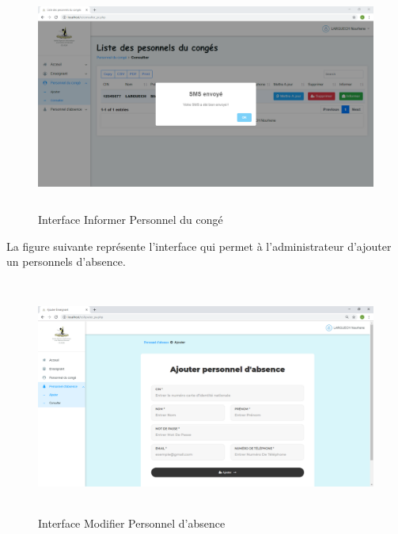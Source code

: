 \documentclass[12 pt ]{report}
\begin{document}
\begin{figure}[h]
 \begin{center}
\includegraphics[width= 16 cm ,height=  7.5cm]{informer_pc.PNG}
\caption{Interface Informer Personnel du congé}

\end{center}

\end{figure}
\newpage
La figure suivante représente l'interface qui permet à l'administrateur d'ajouter un personnels d'absence.
\begin{figure}[h]
 \begin{center}
\includegraphics[width= 16 cm ,height=  7.75cm]{ajouter_pa.PNG}
\caption{Interface Modifier Personnel d'absence}

\end{center}
\end{figure}\\
\end{document}
